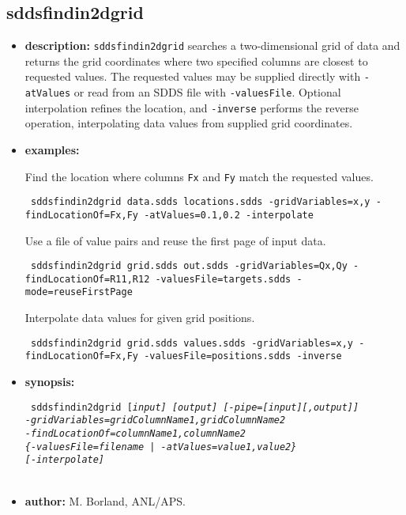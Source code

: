 \newpage
\subsection{sddsfindin2dgrid}
\label{sddsfindin2dgrid}

\begin{itemize}
\item {\bf description:} \verb|sddsfindin2dgrid| searches a two-dimensional grid of data and returns the grid coordinates where two specified columns are closest to requested values. The requested values may be supplied directly with \verb|-atValues| or read from an SDDS file with \verb|-valuesFile|. Optional interpolation refines the location, and \verb|-inverse| performs the reverse operation, interpolating data values from supplied grid coordinates.
\item {\bf examples:}

Find the location where columns \verb|Fx| and \verb|Fy| match the requested values.
\begin{flushleft}{\tt
sddsfindin2dgrid data.sdds locations.sdds -gridVariables=x,y -findLocationOf=Fx,Fy -atValues=0.1,0.2 -interpolate
}\end{flushleft}

Use a file of value pairs and reuse the first page of input data.
\begin{flushleft}{\tt
sddsfindin2dgrid grid.sdds out.sdds -gridVariables=Qx,Qy -findLocationOf=R11,R12 -valuesFile=targets.sdds -mode=reuseFirstPage
}\end{flushleft}

Interpolate data values for given grid positions.
\begin{flushleft}{\tt
sddsfindin2dgrid grid.sdds values.sdds -gridVariables=x,y -findLocationOf=Fx,Fy -valuesFile=positions.sdds -inverse
}\end{flushleft}

\item {\bf synopsis:}
\begin{flushleft}{\tt
sddsfindin2dgrid [\em input] [\em output] [-pipe=[input][,output]] \\
  -gridVariables=\em gridColumnName1,gridColumnName2 \\
  -findLocationOf=\em columnName1,columnName2 \\
  \{-valuesFile=\em filename\ |\ -atValues=\em value1,value2\} \\
  [-presorted] [-interpolate] \\
  [-mode=\{onePairPerPage|reuseFirstPage|all\}] \\
  [-inverse]
}\end{flushleft}

\item {\bf author:} M. Borland, ANL/APS.
\end{itemize}
